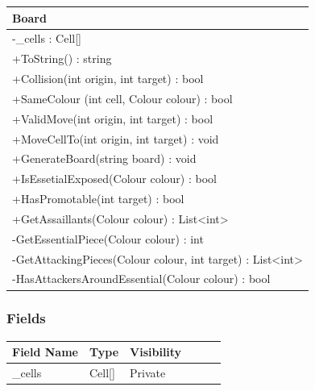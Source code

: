 \documentclass[12pt]{article}
\begin{document}
\begin{table}[H]
    \begin{tabular}{|l|}
    \hline
    \rowcolor[HTML]{C0C0C0} 
    \textbf{Board}                                             \\ \hline
    \rowcolor[HTML]{EFEFEF}                                    
    -\_cells : Cell[]                                          \\ \hline
    +ToString() : string                                       \\ \hline
    +Collision(int origin, int target) : bool                  \\ \hline
    +SameColour (int cell, Colour colour) : bool               \\ \hline
    +ValidMove(int origin, int target) : bool                  \\ \hline
    +MoveCellTo(int origin, int target) : void                 \\ \hline
    +GenerateBoard(string board) : void                        \\ \hline
    +IsEssetialExposed(Colour colour) : bool                   \\ \hline
    +HasPromotable(int target) : bool                          \\ \hline
    +GetAssaillants(Colour colour) : List<int>                 \\ \hline
    -GetEssentialPiece(Colour colour) : int                    \\ \hline
    -GetAttackingPieces(Colour colour, int target) : List<int> \\ \hline
    -HasAttackersAroundEssential(Colour colour) : bool          \\ \hline
    \end{tabular}
\end{table}

\subsubsection{Fields}

\begin{table}[H]
    \begin{tabular}{llllll}
    \hline
    \multicolumn{1}{|l|}{\cellcolor[HTML]{EFEFEF}\textbf{Field Name}} & \multicolumn{1}{l|}{\cellcolor[HTML]{EFEFEF}\textbf{Type}} & \multicolumn{1}{l|}{\cellcolor[HTML]{EFEFEF}\textbf{Visibility}} \\ \hline
    \multicolumn{1}{|l|}{\_cells}                                     & \multicolumn{1}{l|}{Cell[]}                                & \multicolumn{1}{l|}{Private}                                     \\ \hline
    \end{tabular}
\end{table}
\end{document}
